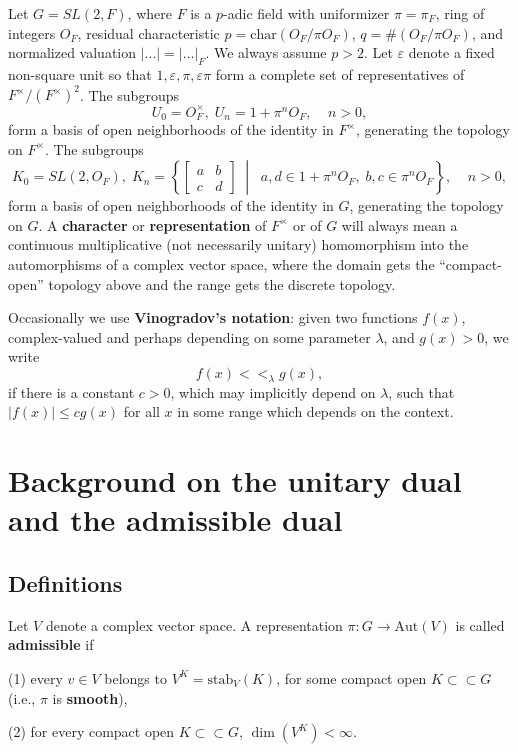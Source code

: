 \documentclass[11pt, a4paper]{article}
\begin{document}
Let $G=SL(2,F)$, where $F$ is a $p$-adic field with uniformizer $\pi =\pi _F$,
ring of integers $O_F$, residual characteristic $p=\mathrm{char}(O_F/\pi O_F)$,
$q=\#(O_F/\pi O_F)$, and normalized valuation $|...| = |...|_F$. We always
assume $p>2$. Let $\varepsilon $ denote a fixed non-square unit so that
$1,\varepsilon ,\pi ,\varepsilon \pi $ form a complete set of representatives
of $F^{\times }/(F^{\times })^2$. The subgroups
\[
U_0=O_F^{\times },\;U_n=1+\pi ^nO_F,\;\;\;\;n>0,
\]
form a basis of open neighborhoods of the identity in $F^{\times }$,
generating the topology on $F^{\times }$. The subgroups
\[
K_0=SL(2,O_F),\;K_n=\left\{ \left[ 
\begin{array}{cc}
a & b \\ 
c & d
\end{array}
\right] \;\middle|\;\;a,d\in 1+\pi ^nO_F,\;b,c\in \pi ^nO_F\right\}
,\;\;\;\;n>0,
\]
form a basis of open neighborhoods of the identity in $G$, generating the
topology on $G$. A {\bf character} or {\bf representation} of $F^{\times }$
or of $G$ will always mean a continuous multiplicative (not necessarily
unitary) homomorphism into the automorphisms of a complex vector space,
where the domain gets the ``compact-open'' topology above and the range gets
the discrete topology.

Occasionally we use {\bf Vinogradov's notation}: given two functions $f(x)$,
complex-valued and perhaps depending on some parameter $\lambda $, and
$g(x)>0$, we write
\[
f(x)<<_\lambda g(x),
\]
if there is a constant $c>0$, which may implicitly depend on $\lambda $,
such that $|f(x)|\leq cg(x)$ for all $x$ in some range which depends on the
context.

\section{Background on the unitary dual and the admissible dual}

\subsection{Definitions}

Let $V$ denote a complex vector space. A representation $\pi :G\rightarrow
\mathrm{Aut}(V)$ is called {\bf admissible} if

(1) every $v\in V$ belongs to $V^K=\mathrm{stab}_V(K)$, for some compact open
$K\subset \subset G$ (i.e., $\pi $ is {\bf smooth}),

(2) for every compact open $K\subset \subset G$, $\dim (V^K)<\infty $.
\end{document}
